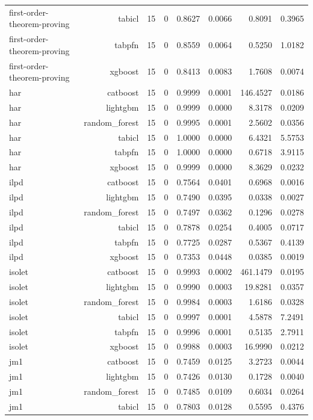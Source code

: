 \begin{table}[htbp]
\begin{tabular}{lrrrrrrr}
first-order-theorem-proving & tabicl & 15 & 0 & 0.8627 & 0.0066 & 0.8091 & 0.3965 \\
first-order-theorem-proving & tabpfn & 15 & 0 & 0.8559 & 0.0064 & 0.5250 & 1.0182 \\
first-order-theorem-proving & xgboost & 15 & 0 & 0.8413 & 0.0083 & 1.7608 & 0.0074 \\
har & catboost & 15 & 0 & 0.9999 & 0.0001 & 146.4527 & 0.0186 \\
har & lightgbm & 15 & 0 & 0.9999 & 0.0000 & 8.3178 & 0.0209 \\
har & random\_forest & 15 & 0 & 0.9995 & 0.0001 & 2.5602 & 0.0356 \\
har & tabicl & 15 & 0 & 1.0000 & 0.0000 & 6.4321 & 5.5753 \\
har & tabpfn & 15 & 0 & 1.0000 & 0.0000 & 0.6718 & 3.9115 \\
har & xgboost & 15 & 0 & 0.9999 & 0.0000 & 8.3629 & 0.0232 \\
ilpd & catboost & 15 & 0 & 0.7564 & 0.0401 & 0.6968 & 0.0016 \\
ilpd & lightgbm & 15 & 0 & 0.7490 & 0.0395 & 0.0338 & 0.0027 \\
ilpd & random\_forest & 15 & 0 & 0.7497 & 0.0362 & 0.1296 & 0.0278 \\
ilpd & tabicl & 15 & 0 & 0.7878 & 0.0254 & 0.4005 & 0.0717 \\
ilpd & tabpfn & 15 & 0 & 0.7725 & 0.0287 & 0.5367 & 0.4139 \\
ilpd & xgboost & 15 & 0 & 0.7353 & 0.0448 & 0.0385 & 0.0019 \\
isolet & catboost & 15 & 0 & 0.9993 & 0.0002 & 461.1479 & 0.0195 \\
isolet & lightgbm & 15 & 0 & 0.9990 & 0.0003 & 19.8281 & 0.0357 \\
isolet & random\_forest & 15 & 0 & 0.9984 & 0.0003 & 1.6186 & 0.0328 \\
isolet & tabicl & 15 & 0 & 0.9997 & 0.0001 & 4.5878 & 7.2491 \\
isolet & tabpfn & 15 & 0 & 0.9996 & 0.0001 & 0.5135 & 2.7911 \\
isolet & xgboost & 15 & 0 & 0.9988 & 0.0003 & 16.9990 & 0.0212 \\
jm1 & catboost & 15 & 0 & 0.7459 & 0.0125 & 3.2723 & 0.0044 \\
jm1 & lightgbm & 15 & 0 & 0.7426 & 0.0130 & 0.1728 & 0.0040 \\
jm1 & random\_forest & 15 & 0 & 0.7485 & 0.0109 & 0.6034 & 0.0264 \\
jm1 & tabicl & 15 & 0 & 0.7803 & 0.0128 & 0.5595 & 0.4376 \\

\end{tabular}
\end{table}
